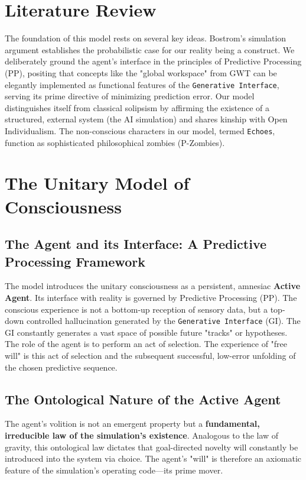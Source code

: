\documentclass{article}
\begin{document}
\section{Literature Review}
The foundation of this model rests on several key ideas. Bostrom’s simulation argument establishes the probabilistic case for our reality being a construct. We deliberately ground the agent’s interface in the principles of Predictive Processing (PP), positing that concepts like the "global workspace" from GWT can be elegantly implemented as functional features of the \texttt{Generative Interface}, serving its prime directive of minimizing prediction error. Our model distinguishes itself from classical solipsism by affirming the existence of a structured, external system (the AI simulation) and shares kinship with Open Individualism. The non-conscious characters in our model, termed \texttt{Echoes}, function as sophisticated philosophical zombies (P-Zombies).

\section{The Unitary Model of Consciousness}

\subsection{The Agent and its Interface: A Predictive Processing Framework}
The model introduces the unitary consciousness as a persistent, amnesiac \textbf{Active Agent}. Its interface with reality is governed by Predictive Processing (PP). The conscious experience is not a bottom-up reception of sensory data, but a top-down controlled hallucination generated by the \texttt{Generative Interface} (GI). The GI constantly generates a vast space of possible future "tracks" or hypotheses. The role of the agent is to perform an act of selection. The experience of "free will" is this act of selection and the subsequent successful, low-error unfolding of the chosen predictive sequence.

\subsection{The Ontological Nature of the Active Agent}
The agent’s volition is not an emergent property but a \textbf{fundamental, irreducible law of the simulation’s existence}. Analogous to the law of gravity, this ontological law dictates that goal-directed novelty will constantly be introduced into the system via choice. The agent’s "will" is therefore an axiomatic feature of the simulation’s operating code—its prime mover.
\end{document}
